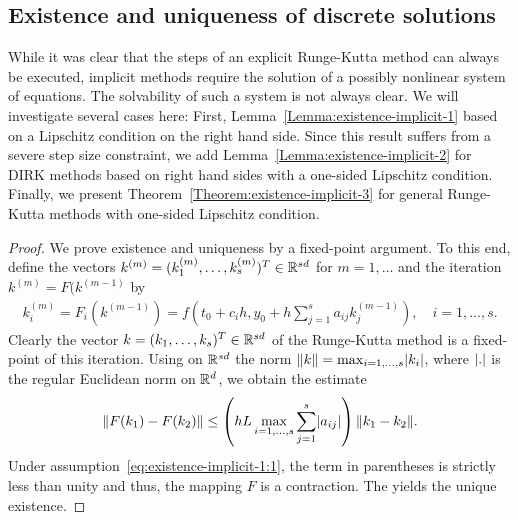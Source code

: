 \subsection{Existence and uniqueness of discrete solutions}

While it was clear that the steps of an explicit Runge-Kutta method
can always be executed, implicit methods require the solution of a
possibly nonlinear system of equations. The solvability of such a
system is not always clear. We will investigate several cases here:
First, Lemma~\ref{Lemma:existence-implicit-1} based on a Lipschitz
condition on the right hand side. Since this result suffers from a
severe step size constraint, we add
Lemma~\ref{Lemma:existence-implicit-2} for DIRK methods based on right
hand sides with a one-sided Lipschitz condition. Finally, we present
Theorem~\ref{Theorem:existence-implicit-3} for general Runge-Kutta
methods with one-sided Lipschitz condition.



\begin{proof}
  We prove existence and uniqueness by a fixed-point argument. To this
  end, define the vectors
  $k^{(m)}=(k_1^{(m)},\dots,k_s^{(m)})^T\in \mathbb R^{s d}$ for $m=1,\dots$
  and the iteration $k^{(m)} = F(k^{(m-1)}$ by
  \begin{gather*}
    k_i^{(m)} = F_i(k^{(m-1)}) = f\left(
      t_0+c_i h, y_0+ h \sum_{j=1}^s a_{ij} k_j^{(m-1)}\right),
    \quad i=1,\dots,s.
  \end{gather*}
  Clearly the vector $k=(k_1,\dots,k_s)^T\in \mathbb R^{s d}$ of the
  Runge-Kutta method is a fixed-point of this iteration. Using on
  $\mathbb R^{s d}$ the norm $\lVert k\rVert = \max_{i=1,\dots,s} \lvert k_i\rvert$, where
  $\lvert.\rvert$ is the regular Euclidean norm on $\mathbb R^d$, we obtain the
  estimate
  \begin{gather*}
    \lVert F(k_1)-F(k_2)\rVert
    \le  \left(h L \max_{i=1,\dots,s} \sum_{j=1}^s \lvert a_{ij}\rvert\right)
    \lVert k_1-k_2\rVert.
  \end{gather*}
  Under assumption~\eqref{eq:existence-implicit-1:1}, the term in
  parentheses is strictly less than unity and thus, the mapping $F$ is
  a contraction. The  yields the
  unique existence.
\end{proof}



